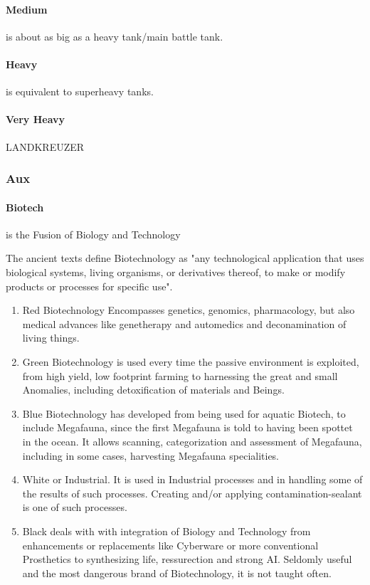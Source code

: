         \paragraph{Medium} is about as big as a heavy tank/main battle tank.
        \paragraph{Heavy} is equivalent to superheavy tanks.
        \paragraph{Very Heavy} LANDKREUZER
    \subsubsection{Aux}
        \paragraph{Biotech} is the Fusion of Biology and Technology \par The ancient texts define Biotechnology as
        "any technological application that uses biological systems, living organisms, or derivatives thereof, to make
        or modify products or processes for specific use".
        \begin{enumerate}[label= -]
            \item{Red} Biotechnology Encompasses genetics, genomics, pharmacology, but also medical advances like
            genetherapy and automedics and deconamination of living things.
            \item{Green} Biotechnology is used every time the passive environment is exploited, from high yield,
            low footprint farming to harnessing the great and small Anomalies, including detoxification of materials and
            Beings.
            \item{Blue} Biotechnology has developed from being used for aquatic Biotech, to include Megafauna, since the
            first Megafauna is told to having been spottet in the ocean.
            It allows scanning, categorization and
            assessment of Megafauna, including in some cases, harvesting Megafauna specialities.
            \item{White} or Industrial.
            It is used in Industrial processes and in handling some of the results of such
            processes.
            Creating and/or applying contamination-sealant is one of such processes.
            \item{Black} deals with with integration of Biology and Technology from enhancements or replacements like
            Cyberware or more conventional Prosthetics to synthesizing life, ressurection and strong AI. Seldomly useful
            and the most dangerous brand of Biotechnology, it is not taught often.
        \end{enumerate}
    \pagebreak
